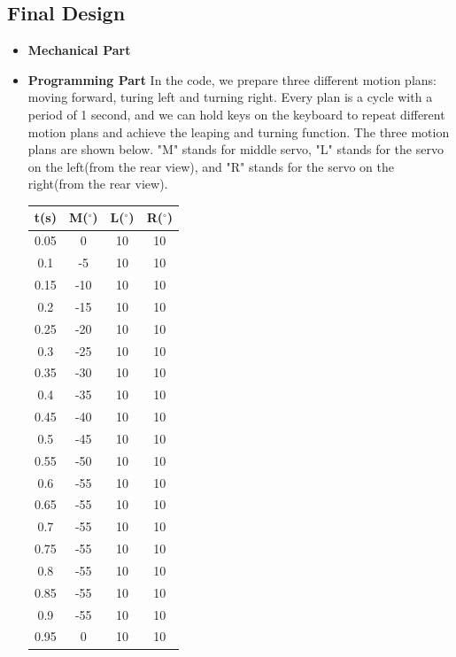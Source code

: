 \documentclass[a4paper, 12pt, oneside]{article} %
\begin{document}
\subsection{Final Design}
\begin{itemize}
	
	\item \textbf{Mechanical Part}
		\newline
		 
	\item \textbf{Programming Part}\newline
		In the code, we prepare three different motion plans: moving forward, turing left and turning right. Every plan is a cycle with a period of 1 second, and we can hold keys on the keyboard to repeat different motion plans and achieve the leaping and turning function. The three motion plans are shown below. "M" stands for middle servo, "L" stands for the servo on the left(from the rear view), and "R" stands for the servo on the right(from the rear view).
		\begin{table}[htbp]
			\begin{minipage}{0.33\textwidth}
				\centering
				\begin{tabular}{cccc}
					\hline
					t(s) & M($^{\circ}$) & L($^{\circ}$) & R($^{\circ}$)\\
					\hline
					0.05&0&10&10\\
					0.1&-5&10&10\\
					0.15&-10&10&10\\
					0.2&-15&10&10\\
					0.25&-20&10&10\\
					0.3&-25&10&10\\
					0.35&-30&10&10\\
					0.4&-35&10&10\\
					0.45&-40&10&10\\
					0.5&-45&10&10\\
					0.55&-50&10&10\\
					0.6&-55&10&10\\
					0.65&-55&10&10\\
					0.7&-55&10&10\\
					0.75&-55&10&10\\
					0.8&-55&10&10\\
					0.85&-55&10&10\\
					0.9&-55&10&10\\
					0.95&0&10&10\\
					\hline
				\end{tabular}

\end{minipage}
\end{table}
\end{itemize}
\end{document}
